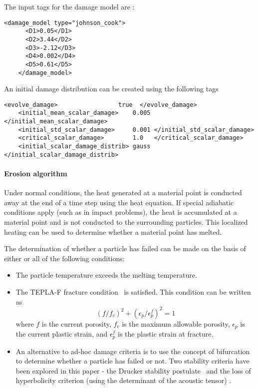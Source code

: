   The input tags for the damage model are :
  \begin{Verbatim}[fontsize=\footnotesize]
    <damage_model type="johnson_cook">
      <D1>0.05</D1>
      <D2>3.44</D2>
      <D3>-2.12</D3>
      <D4>0.002</D4>
      <D5>0.61</D5>
    </damage_model>
  \end{Verbatim}

  An initial damage distribution can be created using the following tags
  \begin{Verbatim}[fontsize=\footnotesize]
    <evolve_damage>                 true  </evolve_damage>
    <initial_mean_scalar_damage>    0.005  </initial_mean_scalar_damage>
    <initial_std_scalar_damage>     0.001 </initial_std_scalar_damage>
    <critical_scalar_damage>        1.0   </critical_scalar_damage>
    <initial_scalar_damage_distrib> gauss </initial_scalar_damage_distrib>
  \end{Verbatim}

  \paragraph{Erosion algorithm}
  Under normal conditions, the heat generated at a material point is conducted
  away at the end of a time step using the heat equation.  If special adiabatic
  conditions apply (such as in impact problems), the heat is accumulated at a
  material point and is not conducted to the surrounding particles.  This
  localized heating can be used to determine whether a material point has
  melted.

  The determination of whether a particle has failed can be made on the
  basis of either or all of the following conditions:
  \begin{itemize}
    \item The particle temperature exceeds the melting temperature.
    \item The TEPLA-F fracture condition~\cite{Johnson88} is satisfied.
       This condition can be written as
       \begin{equation}
         (f/f_c)^2 + (\epsilon_p/\epsilon_p^f)^2 = 1
       \end{equation}
       where $f$ is the current porosity, $f_c$ is the maximum
       allowable porosity, $\epsilon_p$ is the current plastic strain, and
       $\epsilon_p^f$ is the plastic strain at fracture.
    \item An alternative to ad-hoc damage criteria is to use the concept of
       bifurcation to determine whether a particle has failed or not.  Two
       stability criteria have been explored in this paper - the Drucker
       stability postulate~\cite{Drucker59} and the loss of hyperbolicity
       criterion (using the determinant of the acoustic tensor)
       \cite{Rudnicki75,Perzyna98}.
  \end{itemize}

